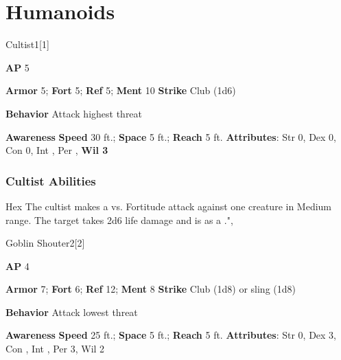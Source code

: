 \section{Humanoids}
\begin{monsection}{Cultist}{1}[1]
\vspace{-1em}\vspace{-1em}
\begin{spellcontent}
\begin{spelltargetinginfo}
{\textbf{AP} 5}

\pari \textbf{Armor} 5;
\textbf{Fort} 5;
\textbf{Ref} 5;
\textbf{Ment} 10
\pari \textbf{Strike} Club  (1d6)



\pari \textbf{Behavior} Attack highest threat
\end{spelltargetinginfo}
\end{spellcontent}

\begin{monsterfooter}
\pari \textbf{Awareness} 
\pari \textbf{Speed} 30 ft.;
\textbf{Space} 5 ft.;
\textbf{Reach} 5 ft.
\pari \textbf{Attributes}:
Str 0,
Dex 0,
Con 0,
Int ,
Per ,
\textbf{Wil 3}
\end{monsterfooter}
\end{monsection}


\subsubsection{Cultist Abilities}

\begin{ability}{Hex}
The cultist makes a  vs. Fortitude attack against one creature in Medium range.
\hit The target takes 2d6 life damage and is  as a .",
\end{ability}

\begin{monsection}{Goblin Shouter}{2}[2]
\vspace{-1em}\vspace{-1em}
\begin{spellcontent}
\begin{spelltargetinginfo}
{\textbf{AP} 4}

\pari \textbf{Armor} 7;
\textbf{Fort} 6;
\textbf{Ref} 12;
\textbf{Ment} 8
\pari \textbf{Strike} Club  (1d8) or sling  (1d8)



\pari \textbf{Behavior} Attack lowest threat
\end{spelltargetinginfo}
\end{spellcontent}

\begin{monsterfooter}
\pari \textbf{Awareness} 
\pari \textbf{Speed} 25 ft.;
\textbf{Space} 5 ft.;
\textbf{Reach} 5 ft.
\pari \textbf{Attributes}:
Str 0,
Dex 3,
Con ,
Int ,
Per 3,
Wil 2
\end{monsterfooter}
\end{monsection}


